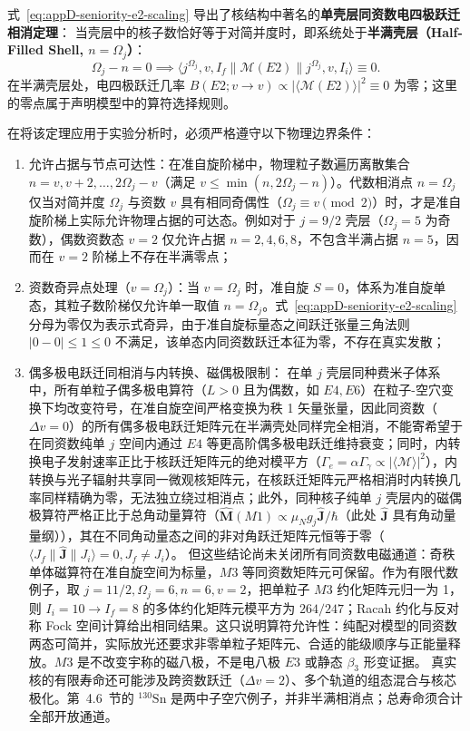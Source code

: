 式~\eqref{eq:appD-seniority-e2-scaling} 导出了核结构中著名的\textbf{单壳层同资数电四极跃迁相消定理}：
当壳层中的核子数恰好等于对简并度时，即系统处于\textbf{半满壳层（Half-Filled Shell, $n = \Omega_j$）}：
\begin{equation}\label{eq:appD-cancellation-theorem}
\Omega_j - n = 0 \implies \langle j^{\Omega_j}, v, I_f \| \mathcal{M}(E2) \| j^{\Omega_j}, v, I_i \rangle \equiv 0.
\end{equation}
在半满壳层处，电四极跃迁几率 $B(E2; v \to v) \propto |\langle \mathcal{M}(E2) \rangle|^2 \equiv 0$ 为零；这里的零点属于声明模型中的算符选择规则。

在将该定理应用于实验分析时，必须严格遵守以下物理边界条件：
\begin{enumerate}
\item 允许占据与节点可达性：在准自旋阶梯中，物理粒子数遍历离散集合 $n = v, v + 2, \dots, 2\Omega_j - v$（满足 $v \le \min(n, 2\Omega_j - n)$）。代数相消点 $n = \Omega_j$ 仅当对简并度 $\Omega_j$ 与资数 $v$ 具有相同奇偶性（$\Omega_j \equiv v \pmod 2$）时，才是准自旋阶梯上实际允许物理占据的可达态。例如对于 $j=9/2$ 壳层（$\Omega_j = 5$ 为奇数），偶数资数态 $v=2$ 仅允许占据 $n = 2, 4, 6, 8$，不包含半满占据 $n=5$，因而在 $v=2$ 阶梯上不存在半满零点；
\item 资数奇异点处理（$v = \Omega_j$）：当 $v = \Omega_j$ 时，准自旋 $S = 0$，体系为准自旋单态，其粒子数阶梯仅允许单一取值 $n = \Omega_j$。式~\eqref{eq:appD-seniority-e2-scaling} 分母为零仅为表示式奇异，由于准自旋标量态之间跃迁张量三角法则 $|0 - 0| \le 1 \le 0$ 不满足，该单态内同资数跃迁本征为零，不存在真实发散；
\item 偶多极电跃迁同相消与内转换、磁偶极限制：
在单 $j$ 壳层同种费米子体系中，所有单粒子偶多极电算符（$L > 0$ 且为偶数，如 $E4, E6$）在粒子-空穴变换下均改变符号，在准自旋空间严格变换为秩 1 矢量张量，因此同资数（$\Delta v = 0$）的所有偶多极电跃迁矩阵元在半满壳处同样完全相消，不能寄希望于在同资数纯单 $j$ 空间内通过 $E4$ 等更高阶偶多极电跃迁维持衰变；同时，内转换电子发射速率正比于核跃迁矩阵元的绝对模平方（$\Gamma_e = \alpha \Gamma_\gamma \propto |\langle \mathcal{M} \rangle|^2$），内转换与光子辐射共享同一微观核矩阵元，在核跃迁矩阵元严格相消时内转换几率同样精确为零，无法独立绕过相消点；此外，同种核子纯单 $j$ 壳层内的磁偶极算符严格正比于总角动量算符（$\hat{\mathbf{M}}(M1) \propto \mu_N g_j \hat{\mathbf{J}}/\hbar$（此处 $\hat{\mathbf J}$ 具有角动量量纲）），其在不同角动量态之间的非对角跃迁矩阵元恒等于零（$\langle J_f \| \hat{\mathbf{J}} \| J_i \rangle = 0, J_f \ne J_i$）。
但这些结论尚未关闭所有同资数电磁通道：奇秩单体磁算符在准自旋空间为标量，$M3$ 等同资数矩阵元可保留。作为有限代数例子，取 $j=11/2,\Omega_j=6,n=6,v=2$，把单粒子 $M3$ 约化矩阵元归一为 1，则 $I_i=10\to I_f=8$ 的多体约化矩阵元模平方为 $264/247$；Racah 约化与反对称 Fock 空间计算给出相同结果。这只说明算符允许性：纯配对模型的同资数两态可简并，实际放光还要求非零单粒子矩阵元、合适的能级顺序与正能量释放。$M3$ 是不改变宇称的磁八极，不是电八极 $E3$ 或静态 $\beta_3$ 形变证据。
真实核的有限寿命还可能涉及跨资数跃迁（$\Delta v=2$）、多个轨道的组态混合与核芯极化。第~4.6~节的 $^{130}\mathrm{Sn}$ 是两中子空穴例子，并非半满相消点；总寿命须合计全部开放通道。
\end{enumerate}

